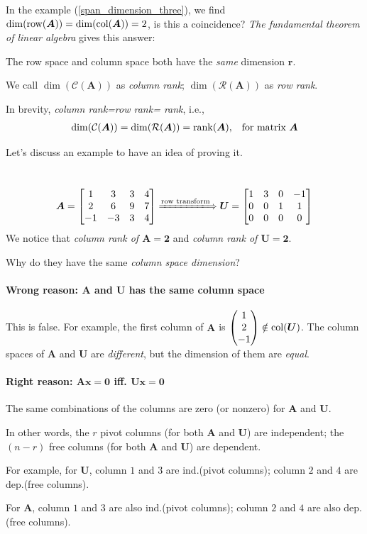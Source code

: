 In the example (\ref{span_dimension_three}), we find $\dim(\operatorname{row}(\bm A)) = \dim(\operatorname{col}(\bm A)) = 2$, is this a coincidence? \textit{The fundamental theorem of linear algebra} gives this answer:
\begin{theorem}\label{column_rank_row_rank}
The row space and column space both have the \emph{same} dimension $\bm r$. 

We call $\dim(\mathcal{C}(\bm A))$ as \textit{column rank}; $\dim(\mathcal{R}(\bm A))$ as \textit{row rank}. 

In brevity, \emph{column rank=row rank= rank}, i.e.,
\[
\begin{array}{ll}
\dim(\mathcal{C}(\bm A)) = \dim(\mathcal{R}(\bm A))=\operatorname{rank}(\bm A),
&
\mbox{for matrix $\bm A$}
\end{array}
\]
\end{theorem}
Let's discuss an example to have an idea of proving it.
\begin{example}
\qquad\\
\[
\bm A = \begin{bmatrix}
1&3&3&4\\2&6&9&7\\-1&-3&3&4
\end{bmatrix}
\xLongrightarrow{\text{row transform}}
\bm U = \begin{bmatrix}
1&3&0&-1\\0&0&1&1\\0&0&0&0
\end{bmatrix}
\]
We notice that \emph{column rank of $\bm A =\bm 2$} and \emph{column rank of $\bm U =\bm 2$}.

Why do they have the same \emph{column space dimension}?

\paragraph{Wrong reason: $\bm A$ and $\bm U$ has the same column space}
This is false. For example, the first column of $\bm A$ is $\begin{pmatrix}
1\\2\\-1
\end{pmatrix}\notin\operatorname{col}(\bm U)$. The column spaces of $\bm A$ and $\bm U$ are \emph{different}, but the dimension of them are \emph{equal}.
\paragraph{Right reason: $\bm{Ax} = \bm 0$ iff. $\bm{Ux} = \bm 0$}
The same combinations of the columns are zero (or nonzero) for $\bm A$ and $\bm U$. 

In other words, the $r$ pivot columns (for both $\bm A$ and $\bm U$) are independent; the $(n-r)$ free columns (for both $\bm A$ and $\bm U$) are dependent. 

For example, for $\bm U$, column $1$ and $3$ are ind.(pivot columns); column $2$ and $4$ are dep.(free columns).

For $\bm A$, column $1$ and $3$ are also ind.(pivot columns); column $2$ and $4$ are also dep.(free columns).
\end{example}
